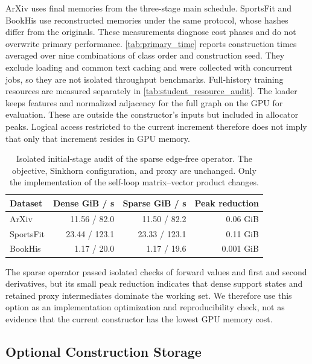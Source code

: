 ArXiv uses final memories from the three-stage main schedule. SportsFit and BookHis use reconstructed
memories under the same protocol, whose hashes differ from the originals. These measurements diagnose cost
phases and do not overwrite primary performance. \autoref{tab:primary_time}
reports construction times averaged over nine combinations of class order and construction seed. They exclude loading and
common text caching and were collected with concurrent
jobs, so they are not isolated throughput benchmarks. Full-history training
resources are measured separately in \autoref{tab:student_resource_audit}.
The loader keeps features and normalized adjacency for the full graph on the GPU for evaluation. These are
outside the constructor's inputs but included in allocator peaks. Logical
access restricted to the current increment therefore does not imply that
only that increment resides in GPU memory.

\begin{table}[H]
\centering
\footnotesize
\setlength{\tabcolsep}{3pt}
\caption{Isolated initial-stage audit of the sparse edge-free operator.
The objective, Sinkhorn configuration, and proxy are unchanged. Only the
implementation of the self-loop matrix--vector product changes.}
\label{tab:sparse_edgefree_cost}
\begin{tabular*}{\linewidth}{@{\extracolsep{\fill}}lrrr@{}}
\toprule
Dataset & Dense GiB / s & Sparse GiB / s & Peak reduction\\
\midrule
ArXiv & 11.56 / 82.0 & 11.50 / 82.2 & 0.06 GiB\\
SportsFit & 23.44 / 123.1 & 23.33 / 123.1 & 0.11 GiB\\
BookHis & 1.17 / 20.0 & 1.17 / 19.6 & 0.001 GiB\\
\bottomrule
\end{tabular*}
\end{table}

The sparse operator passed isolated checks of forward values and first and
second derivatives, but its small peak reduction indicates
that dense support states and retained proxy intermediates dominate the
working set. We therefore use this option as an implementation optimization
and reproducibility check, not as evidence that the current constructor has
the lowest GPU memory cost.

\subsection{Optional Construction Storage}
\label{app:optional_storage}

